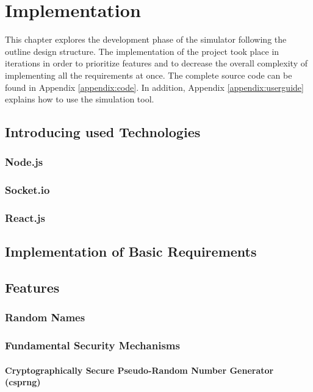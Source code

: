 \chapter{Implementation}
This chapter explores the development phase of the simulator following the outline design structure. The implementation of the project took place in iterations in order to prioritize features and to decrease the overall complexity of implementing all the requirements at once. The complete source code can be found in Appendix \ref{appendix:code}. In addition, Appendix \ref{appendix:userguide} explains how to use the simulation tool.


\section{Introducing used Technologies}

\subsection{Node.js}

\subsection{Socket.io}

\subsection{React.js}


\section{Implementation of Basic Requirements}

\section{Features}

\subsection{Random Names}

\subsection{Fundamental Security Mechanisms}

\subsubsection{Cryptographically Secure Pseudo-Random Number Generator (csprng)}

